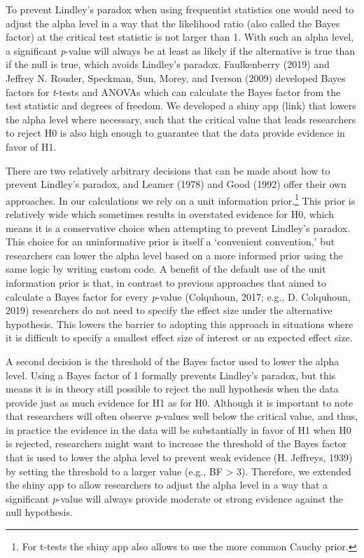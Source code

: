 \documentclass[
  english,
  ,jou, a4paper,floatsintext]{apa6}
\begin{document}
To prevent Lindley's paradox when using frequentist statistics one would need to adjust the alpha level in a way that the likelihood ratio (also called the Bayes factor) at the critical test statistic is not larger than 1. With such an alpha level, a significant \emph{p}-value will always be at least as likely if the alternative is true than if the null is true, which avoids Lindley's paradox. Faulkenberry (2019) and Jeffrey N. Rouder, Speckman, Sun, Morey, and Iverson (2009) developed Bayes factors for \emph{t}-tests and ANOVAs which can calculate the Bayes factor from the test statistic and degrees of freedom. We developed a shiny app (link) that lowers the alpha level where necessary, such that the critical value that leads researchers to reject H0 is also high enough to guarantee that the data provide evidence in favor of H1.

There are two relatively arbitrary decisions that can be made about how to prevent Lindley's paradox, and Leamer (1978) and Good (1992) offer their own approaches. In our calculations we rely on a unit information prior.\footnote{For t-tests the shiny app also allows to use the more common Cauchy prior.} This prior is relatively wide which sometimes results in overstated evidence for H0, which means it is a conservative choice when attempting to prevent Lindley's paradox. This choice for an uninformative prior is itself a `convenient convention,' but researchers can lower the alpha level based on a more informed prior using the same logic by writing custom code. A benefit of the default use of the unit information prior is that, in contrast to previous approaches that aimed to calculate a Bayes factor for every \emph{p}-value (Colquhoun, 2017; e.g., D. Colquhoun, 2019) researchers do not need to specify the effect size under the alternative hypothesis. This lowers the barrier to adopting this approach in situations where it is difficult to specify a smallest effect size of interest or an expected effect size.

A second decision is the threshold of the Bayes factor used to lower the alpha level. Using a Bayes factor of 1 formally prevents Lindley's paradox, but this means it is in theory still possible to reject the null hypothesis when the data provide just as much evidence for H1 as for H0. Although it is important to note that researchers will often observe \emph{p}-values well below the critical value, and thus, in practice the evidence in the data will be substantially in favor of H1 when H0 is rejected, researchers might want to increase the threshold of the Bayes factor that is used to lower the alpha level to prevent weak evidence (H. Jeffreys, 1939) by setting the threshold to a larger value (e.g., BF \textgreater{} 3). Therefore, we extended the shiny app to allow researchers to adjust the alpha level in a way that a significant \emph{p}-value will always provide moderate or strong evidence against the null hypothesis.
\end{document}

